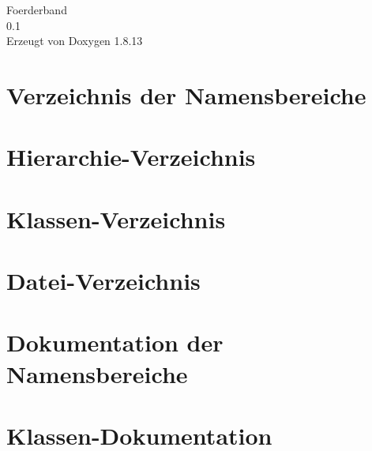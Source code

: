 \documentclass[twoside]{book}
\newcommand{\+}{\discretionary{\mbox{\scriptsize$\hookleftarrow$}}{}{}}
\newcommand{\clearemptydoublepage}{%
  \newpage{\pagestyle{empty}\cleardoublepage}%
}
\begin{document}
\hypersetup{pageanchor=false,
             bookmarksnumbered=true,
             pdfencoding=unicode
            }
\begin{titlepage}
\vspace*{7cm}
\begin{center}%
{\Large Foerderband \\[1ex]\large 0.\+1 }\\
\vspace*{1cm}
{\large Erzeugt von Doxygen 1.8.13}\\
\end{center}
\end{titlepage}
\clearemptydoublepage
{}
\tableofcontents
\clearemptydoublepage
{}
\hypersetup{pageanchor=true}

\chapter{Verzeichnis der Namensbereiche}

\chapter{Hierarchie-\/\+Verzeichnis}

\chapter{Klassen-\/\+Verzeichnis}

\chapter{Datei-\/\+Verzeichnis}

\chapter{Dokumentation der Namensbereiche}

\chapter{Klassen-\/\+Dokumentation}



























\end{document}
